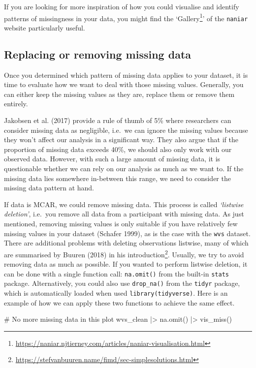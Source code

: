 \documentclass[
  letterpaper,
]{krantz}
\makeatletter
\newenvironment{Shaded}{\begin{snugshade}}{\end{snugshade}}
\newcommand{\CommentTok}[1]{\textcolor[rgb]{0.37,0.37,0.37}{#1}}
\newcommand{\FunctionTok}[1]{\textcolor[rgb]{0.28,0.35,0.67}{#1}}
\newcommand{\NormalTok}[1]{\textcolor[rgb]{0.00,0.23,0.31}{#1}}
\newcommand{\SpecialCharTok}[1]{\textcolor[rgb]{0.37,0.37,0.37}{#1}}
\renewcommand{\href}[2]{#2\footnote{\url{#1}}}
\newenvironment{kframe}{%
\medskip{}
\setlength{\fboxsep}{.8em}
 \def\at@end@of@kframe{}%
 \ifinner\ifhmode%
  \def\at@end@of@kframe{\end{minipage}}%
  \begin{minipage}{\columnwidth}%
 \fi\fi%
 \def\FrameCommand##1{\hskip\@totalleftmargin \hskip-\fboxsep
 \colorbox{shadecolor}{##1}\hskip-\fboxsep
     \hskip-\linewidth \hskip-\@totalleftmargin \hskip\columnwidth}%
 \MakeFramed {\advance\hsize-\width
   \@totalleftmargin\z@ \linewidth\hsize
   \@setminipage}}%
 {\par\unskip\endMakeFramed%
 \at@end@of@kframe}
\renewenvironment{Shaded}{\begin{kframe}}{\end{kframe}}
\makeatother
\begin{document}
If you are looking for more inspiration of how you could visualise and
identify patterns of missingness in your data, you might find the
`\href{https://naniar.njtierney.com/articles/naniar-visualisation.html}{Gallery}'
of the \texttt{naniar} website particularly useful.

\subsection{Replacing or removing missing
data}\label{sec-replacing-removing-missing-data}

Once you determined which pattern of missing data applies to your
dataset, it is time to evaluate how we want to deal with those missing
values. Generally, you can either keep the missing values as they are,
replace them or remove them entirely.

Jakobsen et al. (2017) provide a rule of thumb of 5\% where researchers
can consider missing data as negligible, i.e.~we can ignore the missing
values because they won't affect our analysis in a significant way. They
also argue that if the proportion of missing data exceeds 40\%, we
should also only work with our observed data. However, with such a large
amount of missing data, it is questionable whether we can rely on our
analysis as much as we want to. If the missing data lies somewhere
in-between this range, we need to consider the missing data pattern at
hand.

If data is MCAR, we could remove missing data. This process is called
\emph{`listwise deletion'}, i.e.~you remove all data from a participant
with missing data. As just mentioned, removing missing values is only
suitable if you have relatively few missing values in your dataset
(Schafer 1999), as is the case with the \texttt{wvs} dataset. There are
additional problems with deleting observations listwise, many of which
are summarised by Buuren (2018) in his
\href{https://stefvanbuuren.name/fimd/sec-simplesolutions.html}{introduction}.
Usually, we try to avoid removing data as much as possible. If you
wanted to perform listwise deletion, it can be done with a single
function call: \texttt{na.omit()} from the built-in \texttt{stats}
package. Alternatively, you could also use \texttt{drop\_na()} from the
\texttt{tidyr} package, which is automatically loaded when used
\texttt{library(tidyverse)}. Here is an example of how we can apply
these two functions to achieve the same effect.

\begin{Shaded}
\begin{Highlighting}[]
\CommentTok{\# No more missing data in this plot}
\NormalTok{wvs\_clean }\SpecialCharTok{|\textgreater{}} \FunctionTok{na.omit}\NormalTok{() }\SpecialCharTok{|\textgreater{}} \FunctionTok{vis\_miss}\NormalTok{()}
\end{Highlighting}
\end{Shaded}
\end{document}
